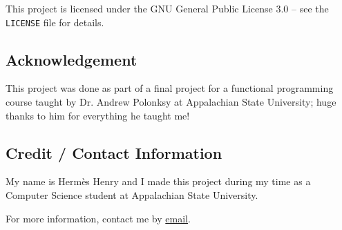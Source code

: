 \documentclass{article}
\begin{document}
This project is licensed under the GNU General Public License 3.0 -- see the \texttt{LICENSE} file for details.


\subsection{Acknowledgement}

This project was done as part of a final project for a functional programming course taught by Dr. Andrew Polonksy at Appalachian State University; huge thanks to him for everything he taught me!


\subsection{Credit / Contact Information}

My name is Hermès Henry and I made this project during my time as a Computer Science student at Appalachian State University.

For more information, contact me by \href{mailto:henryhe@appstate.edu}{email}.
\end{document}
